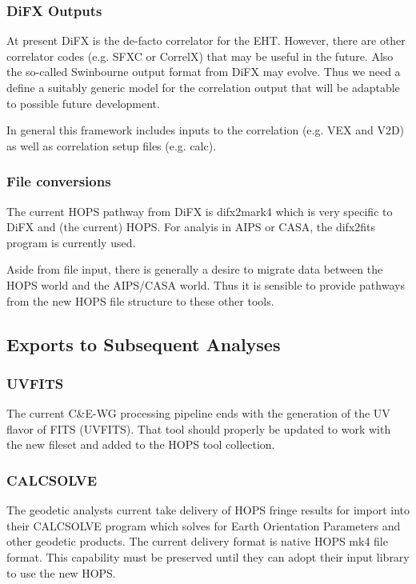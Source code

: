 \subsubsection{DiFX Outputs}
\label{sec:difx-corr}

At present DiFX is the de-facto correlator for the EHT.  However, there
are other correlator codes (e.g. SFXC or CorrelX) that may be useful in
the future.  Also the so-called Swinbourne output format from DiFX may evolve.
Thus we need a define a suitably generic model for the correlation output
that will be adaptable to possible future development.

In general this framework includes inputs to the correlation (e.g.
VEX and V2D) as well as correlation setup files (e.g. calc).

\subsubsection{File conversions}
\label{sec:corr-import}

The current HOPS pathway from DiFX is difx2mark4 which is very specific
to DiFX and (the current) HOPS.  For analyis in AIPS or CASA, the difx2fits
program is currently used.

Aside from file input, there is generally a desire to migrate data
between the HOPS world and the AIPS/CASA world.  Thus it is sensible
to provide pathways from the new HOPS file structure to these other
tools.

\subsection{Exports to Subsequent Analyses}
\label{sec:exports}

\subsubsection{UVFITS}
\label{sec:uvfits}
The current C\&E-WG processing pipeline ends with the generation of
the UV flavor of FITS (UVFITS).  That tool should properly be updated
to work with the new fileset and added to the HOPS tool collection.

\subsubsection{CALCSOLVE}
\label{sec:calcsolve}
The geodetic analysts current take delivery of HOPS fringe results
for import into their CALCSOLVE program which solves for Earth Orientation
Parameters and other geodetic products.  The current delivery format is
native HOPS mk4 file format.  This capability must be preserved until
they can adopt their input library to use the new HOPS.


